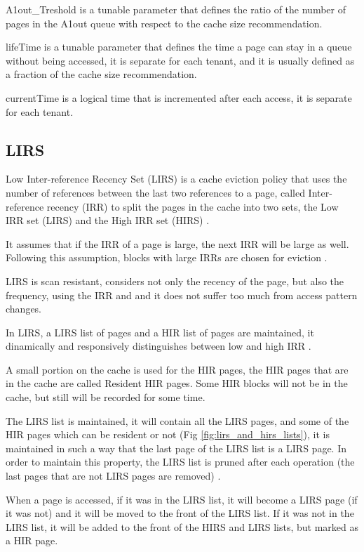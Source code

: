 A1out\_Treshold is a tunable parameter that defines the ratio of the number of pages in the A1out
queue with respect to the cache size recommendation.

lifeTime is a tunable parameter that defines the time a page can stay in a queue without being accessed,
it is separate for each tenant, and it is usually defined as a fraction of the cache size recommendation.

currentTime is a logical time that is incremented after each access, it is separate for each tenant.

\subsection{LIRS}

Low Inter-reference Recency Set (LIRS) is a cache eviction policy that uses the number 
of references between the last two references to a page, called Inter-reference recency
(IRR) to split the pages in the cache into two sets, the Low IRR set (LIRS) and the 
High IRR set (HIRS) \cite{lirs-article}.

It assumes that if the IRR of a page is large, the next IRR will be large as well. Following
this assumption, blocks with large IRRs are chosen for eviction \cite{lirs-article}.

LIRS is scan resistant, considers not only the recency of the page, but also the
frequency, using the IRR and and it does not suffer too much from access pattern changes.

In LIRS, a LIRS list of pages and a HIR list of pages are maintained, it dinamically and 
responsively distinguishes between low and high IRR \cite{lirs-article}.

A small portion on the cache is used for the HIR pages, the HIR pages that are in the cache
are called Resident HIR pages. Some HIR blocks will not be in the cache, but still will be
recorded for some time.

The LIRS list is maintained, it will contain all the LIRS pages, and some of the HIR pages 
which can be resident or not (Fig \ref{fig:lirs_and_hirs_lists}), it is maintained in such a 
way that the last page of the LIRS list is a LIRS page. In order to maintain this property,
the LIRS list is pruned after each operation (the last pages that are not LIRS pages are removed)
\cite{lirs-article}.

When a page is accessed, if it was in the LIRS list, it will become a LIRS page (if it was not)
and it will be moved to the front of the LIRS list. If it was not in the LIRS list, it will be
added to the front of the HIRS and LIRS lists, but marked as a HIR page.

